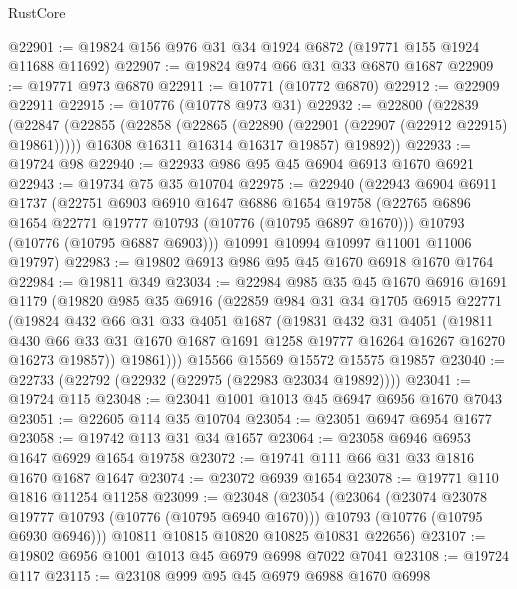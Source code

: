 \begin{lexlean}{RustCore}
\begin{coremodule}
@22901 := @19824 @156 @976 @31 @34 @1924 @6872 (@19771 @155 @1924 @11688 @11692)
@22907 := @19824 @974 @66 @31 @33 @6870 @1687
@22909 := @19771 @973 @6870
@22911 := @10771 (@10772 @6870)
@22912 := @22909 @22911
@22915 := @10776 (@10778 @973 @31)
@22932 := @22800
    (@22839
      (@22847
        (@22855
          (@22858 (@22865 (@22890 (@22901 (@22907 (@22912 @22915) @19861)))))
          @16308
          @16311
          @16314
          @16317
          @19857)
        @19892))
@22933 := @19724 @98
@22940 := @22933 @986 @95 @45 @6904 @6913 @1670 @6921
@22943 := @19734 @75 @35 @10704
@22975 := @22940
    (@22943
      @6904
      @6911
      @1737
      (@22751
        @6903
        @6910
        @1647
        @6886
        @1654
        @19758
        (@22765 @6896 @1654 @22771 @19777 @10793 (@10776 (@10795 @6897 @1670)))
        @10793
        (@10776 (@10795 @6887 @6903)))
      @10991
      @10994
      @10997
      @11001
      @11006
      @19797)
@22983 := @19802 @6913 @986 @95 @45 @1670 @6918 @1670 @1764
@22984 := @19811 @349
@23034 := @22984
    @985
    @35
    @45
    @1670
    @6916
    @1691
    @1179
    (@19820
      @985
      @35
      @6916
      (@22859
        @984
        @31
        @34
        @1705
        @6915
        @22771
        (@19824
          @432
          @66
          @31
          @33
          @4051
          @1687
          (@19831
            @432
            @31
            @4051
            (@19811
              @430
              @66
              @33
              @31
              @1670
              @1687
              @1691
              @1258
              @19777
              @16264
              @16267
              @16270
              @16273
              @19857))
          @19861)))
    @15566
    @15569
    @15572
    @15575
    @19857
@23040 := @22733 (@22792 (@22932 (@22975 (@22983 @23034 @19892))))
@23041 := @19724 @115
@23048 := @23041 @1001 @1013 @45 @6947 @6956 @1670 @7043
@23051 := @22605 @114 @35 @10704
@23054 := @23051 @6947 @6954 @1677
@23058 := @19742 @113 @31 @34 @1657
@23064 := @23058 @6946 @6953 @1647 @6929 @1654 @19758
@23072 := @19741 @111 @66 @31 @33 @1816 @1670 @1687 @1647
@23074 := @23072 @6939 @1654
@23078 := @19771 @110 @1816 @11254 @11258
@23099 := @23048
    (@23054
      (@23064
        (@23074 @23078 @19777 @10793 (@10776 (@10795 @6940 @1670)))
        @10793
        (@10776 (@10795 @6930 @6946)))
      @10811
      @10815
      @10820
      @10825
      @10831
      @22656)
@23107 := @19802 @6956 @1001 @1013 @45 @6979 @6998 @7022 @7041
@23108 := @19724 @117
@23115 := @23108 @999 @95 @45 @6979 @6988 @1670 @6998

\end{coremodule}
\end{lexlean}
